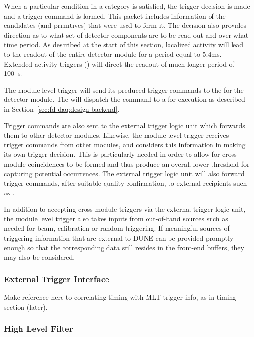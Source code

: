 When a particular condition in a category is satisfied, the trigger
decision is made and a trigger command is formed. 
This packet includes information of the candidates (and primitives)
that were used to form it. 
The decision also provides direction as to what set of detector components
are to be read out and over what time period.
As described at the start of this section, localized activity will lead
to the readout of the entire detector module for a period equal to 5.4\si{\milli\second}.  Extended activity triggers () will
direct the readout of much longer period of \SI{100}{s}.

The module level trigger will send its produced trigger commands to the
 for the detector module.  The
 will dispatch the command to a  for
execution as described in Section~\ref{sec:fd-daq:design-backend}.

Trigger commands are also sent to the external trigger logic unit which
forwards them to other detector modules. Likewise, the module level
trigger receives trigger commands from other modules, and considers
this information in making its own trigger decision.
This is particularly needed in order to allow for cross-module
coincidences to be formed and thus produce an overall lower threshold for
capturing potential  occurrences. 
The external trigger logic unit will also forward  trigger
commands, after suitable quality confirmation, to external recipients
such as .

In addition to accepting cross-module triggers via the external trigger
logic unit, the module level trigger also takes inputs from out-of-band sources such as
needed for beam, calibration or random triggering. 
If meaningful sources of triggering information that are external to
DUNE can be provided promptly enough so that the corresponding data
still resides in the front-end buffers, they may also be considered.

\subsubsection{External Trigger Interface}

Make reference here to correlating timing with MLT trigger info, as in
timing section (later).

\subsubsection{High Level Filter}
\label{sec:fd-daq:design-data-reduction}

